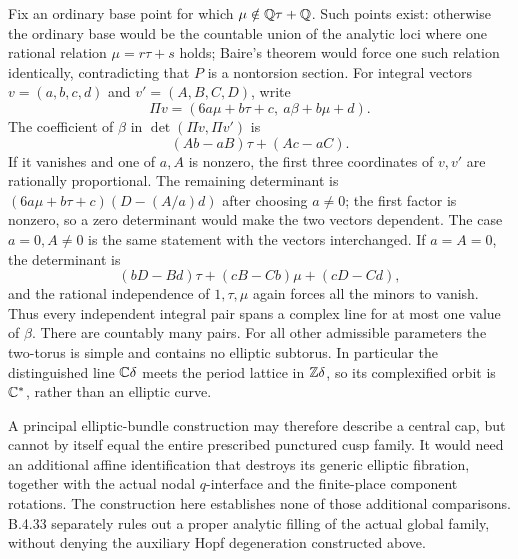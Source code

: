 \begin{remark}
Fix an ordinary base point for which
$\mu\notin\mathbb Q\tau+\mathbb Q$.  Such points exist: otherwise the
ordinary base would be the countable union of the analytic loci
where one rational relation $\mu=r\tau+s$ holds; Baire's
theorem would force one such relation identically, contradicting
that $P$ is a nontorsion section.  For integral vectors
$v=(a,b,c,d)$ and $v'=(A,B,C,D)$, write
\[
 \Pi v=(6a\mu+b\tau+c,\ a\beta+b\mu+d).
\]
The coefficient of $\beta$ in
$\det(\Pi v,\Pi v')$ is
\[
 (Ab-aB)\tau+(Ac-aC).
\]
If it vanishes and one of $a,A$ is nonzero, the first three
coordinates of $v,v'$ are rationally proportional.  The
remaining determinant is
$(6a\mu+b\tau+c)(D-(A/a)d)$ after choosing $a\ne0$;
the first factor is nonzero, so a zero determinant would make
the two vectors dependent.  The case $a=0,A\ne0$ is the
same statement with the vectors interchanged.  If $a=A=0$,
the determinant is
\[
 (bD-Bd)\tau+(cB-Cb)\mu+(cD-Cd),
\]
and the rational independence of $1,\tau,\mu$ again forces
all the minors to vanish.  Thus every independent integral
pair spans a complex line for at most one value of $\beta$.
There are countably many pairs.  For all other admissible
parameters the two-torus is simple and contains no elliptic
subtorus.  In particular the distinguished line $\mathbb C\delta$
meets the period lattice in $\mathbb Z\delta$, so its complexified
orbit is $\mathbb C^*$, rather than an elliptic curve.

A principal elliptic-bundle construction may therefore describe
a central cap, but cannot by itself equal the entire prescribed
punctured cusp family.  It would need an additional affine
identification that destroys its generic elliptic fibration,
together with the actual nodal $q$-interface and the finite-place
component rotations. The construction here establishes none of
those additional comparisons. B.4.33 separately rules out a proper
analytic filling of the actual global family, without denying the
auxiliary Hopf degeneration constructed above.
\end{remark}
